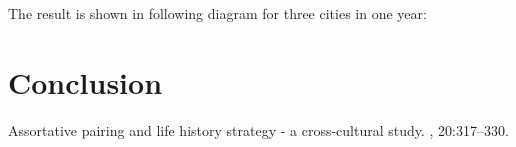 \documentclass[DIV=calc, paper=a4, fontsize=11pt, twocolumn]{scrartcl}
\begin{document}
The result is shown in following diagram for three cities in one year:


\section{Conclusion}

\begin{thebibliography}{99}
\newblock Assortative pairing and life history strategy - a cross-cultural
  study.
, 20:317--330.
 \end{thebibliography}
\end{document}
